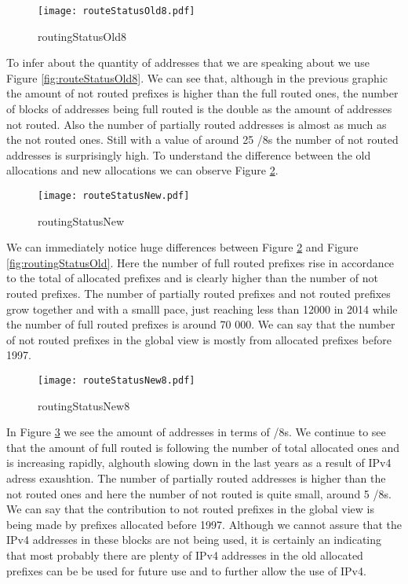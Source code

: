 \documentclass[11pt,a4paper]{scrreprt}
\begin{document}
\begin{figure}[ht!]
\centering
\texttt{[image: routeStatusOld8.pdf]}
\caption{routingStatusOld8}
\label{fig:routingStatusOld8}
\end{figure}

To infer about the quantity of addresses that we are speaking about we use Figure \ref{fig:routeStatusOld8}. We can see that, although in the previous graphic the amount of not routed prefixes is higher than the full routed ones, the number of blocks of addresses being full routed is the double as the amount of addresses not routed. Also the number of partially routed addresses is almost as much as the not routed ones. Still with a value of around 25 /8s the number of not routed addresses is surprisingly high. To understand the difference between the old allocations and new allocations we can observe Figure \ref{fig:routingStatusNew}.

\begin{figure}[ht!]
\centering
\texttt{[image: routeStatusNew.pdf]}
\caption{routingStatusNew}
\label{fig:routingStatusNew}
\end{figure}

We can immediately notice huge differences between Figure \ref{fig:routingStatusNew} and Figure \ref{fig:routingStatusOld}. Here the number of full routed prefixes rise in accordance to the total of allocated prefixes and is clearly higher than the number of not routed prefixes. The number of partially routed prefixes and not routed prefixes grow together and with a smalll pace, just reaching less than 12000 in 2014 while the number of full routed prefixes is around 70 000. We can say that the number of not routed prefixes in the global view is mostly from allocated prefixes before 1997.


\begin{figure}[ht!]
\centering
\texttt{[image: routeStatusNew8.pdf]}
\caption{routingStatusNew8}
\label{fig:routingStatusNew8}
\end{figure}

In Figure \ref{fig:routingStatusNew8} we see the amount of addresses in terms of /8s. We continue to see that the amount of full routed is following the number of total allocated ones and is increasing rapidly, alghouth slowing down in the last years as a result of IPv4 adress exaushtion. The number of partially routed addresses is higher than the not routed ones and here the number of not routed is quite small, around 5 /8s. We can say that the contribution to not routed prefixes in the global view is being made by prefixes allocated before 1997. Although we cannot assure that the IPv4 addresses in these blocks are not being used, it is certainly an indicating that most probably there are plenty of IPv4 addresses in the old allocated prefixes can be be used for future use and to further allow the use of IPv4.
\end{document}
